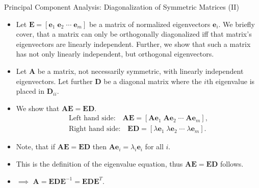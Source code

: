 \begin{frame}{Principal Component Analysis: Diagonalization of Symmetric 
Matrices (II)}
	\begin{itemize}
		\item Let $\mathbf{E} = [\mathbf{e}_1 \; \mathbf{e}_2 \; \cdots \; 
		\mathbf{e}_m]$ be a matrix of normalized eigenvectors $\mathbf{e}_i$. 
		We briefly cover, that a matrix can only be orthogonally diagonalized 
		iff that matrix's eigenvectors are linearly independent. Further, we 
		show that such a matrix has not only linearly independent, but 
		orthogonal eigenvectors.
		\item Let $\mathbf{A}$ be a matrix, not necessarily symmetric, with 
		linearly independent eigenvectors. Let further $\mathbf{D}$ be a 
		diagonal matrix where the $i$th eigenvalue is placed in 
		$\mathbf{D}_{ii}$.
		\item We show that $\mathbf{AE} = \mathbf{ED}$.
		\begin{align}
			\text{Left hand side:} \quad \mathbf{AE} = [\mathbf{Ae}_1 \; 
			\mathbf{Ae}_2 \; \cdots \; \mathbf{Ae}_m],                    \\
			\text{Right hand side:} \quad \mathbf{ED} = [\lambda\mathbf{e}_1 \; 
			\lambda\mathbf{e}_2 \; \cdots \; \lambda\mathbf{e}_m]. 
		\end{align}
		\item Note, that if $\mathbf{AE} = \mathbf{ED}$ then $\mathbf{Ae}_i = 
		\lambda_i\mathbf{e}_i$ for all $i$. \\
		\item This is the definition of the eigenvalue equation, thus 
		$\mathbf{AE} = \mathbf{ED}$ follows.
		\item $\implies$ $\mathbf{A} = \mathbf{EDE}^{-1} = \mathbf{EDE}^{T}$.
	\end{itemize}
\end{frame}

